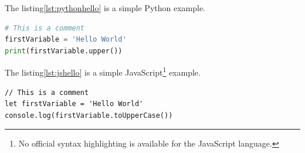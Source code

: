 The listing\ref{lst:pythonhello} is a simple Python example.

\begin{lstlisting}[caption=Python example, label=lst:pythonhello, language=python]
# This is a comment
firstVariable = 'Hello World'
print(firstVariable.upper())
\end{lstlisting}

The listing\ref{lst:jshello} is a simple JavaScript\footnote{No official syntax highlighting is available for the JavaScript language.} example.

\begin{lstlisting}[caption=JavaScript example, label=lst:jshello]
// This is a comment
let firstVariable = 'Hello World'
console.log(firstVariable.toUpperCase())
\end{lstlisting}